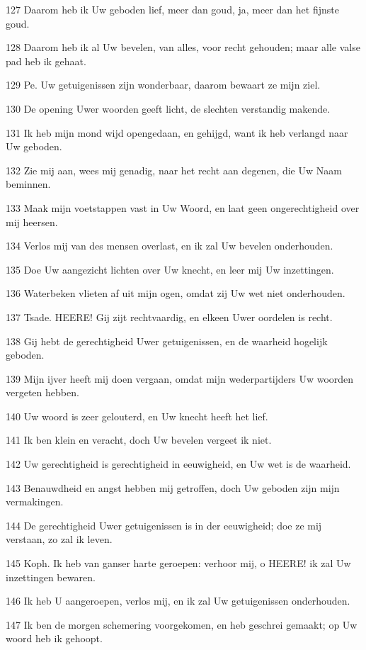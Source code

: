 \par 127 Daarom heb ik Uw geboden lief, meer dan goud, ja, meer dan het fijnste goud.
\par 128 Daarom heb ik al Uw bevelen, van alles, voor recht gehouden; maar alle valse pad heb ik gehaat.
\par 129 Pe. Uw getuigenissen zijn wonderbaar, daarom bewaart ze mijn ziel.
\par 130 De opening Uwer woorden geeft licht, de slechten verstandig makende.
\par 131 Ik heb mijn mond wijd opengedaan, en gehijgd, want ik heb verlangd naar Uw geboden.
\par 132 Zie mij aan, wees mij genadig, naar het recht aan degenen, die Uw Naam beminnen.
\par 133 Maak mijn voetstappen vast in Uw Woord, en laat geen ongerechtigheid over mij heersen.
\par 134 Verlos mij van des mensen overlast, en ik zal Uw bevelen onderhouden.
\par 135 Doe Uw aangezicht lichten over Uw knecht, en leer mij Uw inzettingen.
\par 136 Waterbeken vlieten af uit mijn ogen, omdat zij Uw wet niet onderhouden.
\par 137 Tsade. HEERE! Gij zijt rechtvaardig, en elkeen Uwer oordelen is recht.
\par 138 Gij hebt de gerechtigheid Uwer getuigenissen, en de waarheid hogelijk geboden.
\par 139 Mijn ijver heeft mij doen vergaan, omdat mijn wederpartijders Uw woorden vergeten hebben.
\par 140 Uw woord is zeer gelouterd, en Uw knecht heeft het lief.
\par 141 Ik ben klein en veracht, doch Uw bevelen vergeet ik niet.
\par 142 Uw gerechtigheid is gerechtigheid in eeuwigheid, en Uw wet is de waarheid.
\par 143 Benauwdheid en angst hebben mij getroffen, doch Uw geboden zijn mijn vermakingen.
\par 144 De gerechtigheid Uwer getuigenissen is in der eeuwigheid; doe ze mij verstaan, zo zal ik leven.
\par 145 Koph. Ik heb van ganser harte geroepen: verhoor mij, o HEERE! ik zal Uw inzettingen bewaren.
\par 146 Ik heb U aangeroepen, verlos mij, en ik zal Uw getuigenissen onderhouden.
\par 147 Ik ben de morgen schemering voorgekomen, en heb geschrei gemaakt; op Uw woord heb ik gehoopt.
